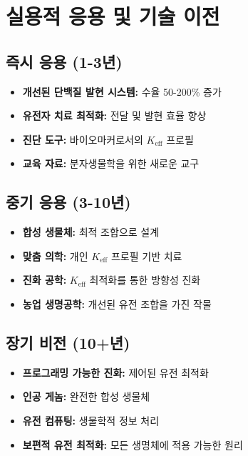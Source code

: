 \documentclass[11pt,a4paper]{article}
\begin{document}
	\section{실용적 응용 및 기술 이전}
	
	\subsection{즉시 응용 (1-3년)}
	
	\begin{itemize}
		\item \textbf{개선된 단백질 발현 시스템:} 수율 50-200\% 증가
		\item \textbf{유전자 치료 최적화:} 전달 및 발현 효율 향상
		\item \textbf{진단 도구:} 바이오마커로서의 $K_{\text{eff}}$ 프로필
		\item \textbf{교육 자료:} 분자생물학을 위한 새로운 교구
	\end{itemize}
	
	\subsection{중기 응용 (3-10년)}
	
	\begin{itemize}
		\item \textbf{합성 생물체:} 최적 조합으로 설계
		\item \textbf{맞춤 의학:} 개인 $K_{\text{eff}}$ 프로필 기반 치료
		\item \textbf{진화 공학:} $K_{\text{eff}}$ 최적화를 통한 방향성 진화
		\item \textbf{농업 생명공학:} 개선된 유전 조합을 가진 작물
	\end{itemize}
	
	\subsection{장기 비전 (10+년)}
	
	\begin{itemize}
		\item \textbf{프로그래밍 가능한 진화:} 제어된 유전 최적화
		\item \textbf{인공 게놈:} 완전한 합성 생물체
		\item \textbf{유전 컴퓨팅:} 생물학적 정보 처리
		\item \textbf{보편적 유전 최적화:} 모든 생명체에 적용 가능한 원리
	\end{itemize}
	
\end{document}
